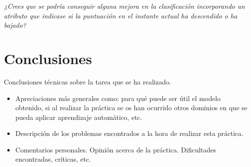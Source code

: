 \documentclass[12pt]{article}
\begin{document}
\emph{¿Crees que se podría conseguir alguna mejora en la clasificación incorporando un atributo que indicase si la puntuación en el instante actual ha descendido o ha bajado?}

\section{Conclusiones}

Conclusiones técnicas sobre la tarea que se ha realizado.
\begin{itemize}
  \item Apreciaciones más generales como: para qué puede ser útil el modelo obtenido, si al realizar la práctica se os han ocurrido otros dominios en que se pueda aplicar aprendizaje automático, etc.
  \item Descripción de los problemas encontrados a la hora de realizar esta práctica.
  \item Comentarios personales. Opinión acerca de la práctica. Dificultades encontradas, críticas, etc.
\end{itemize}
\end{document}
